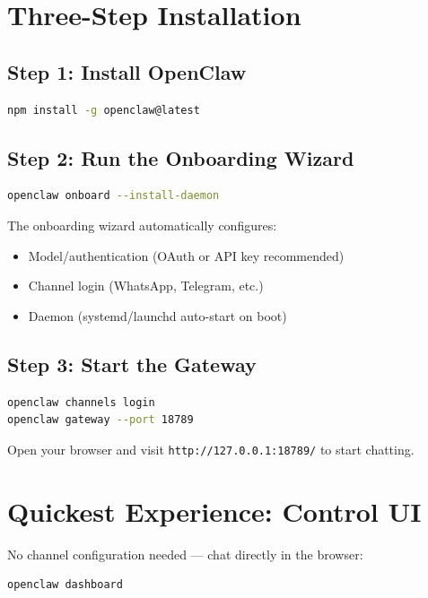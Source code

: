 \section{Three-Step Installation}

\subsection{Step 1: Install OpenClaw}

\begin{lstlisting}[language=bash]
npm install -g openclaw@latest
\end{lstlisting}

\subsection{Step 2: Run the Onboarding Wizard}

\begin{lstlisting}[language=bash]
openclaw onboard --install-daemon
\end{lstlisting}

The onboarding wizard automatically configures:
\begin{itemize}
  \item Model/authentication (OAuth or API key recommended)
  \item Channel login (WhatsApp, Telegram, etc.)
  \item Daemon (systemd/launchd auto-start on boot)
\end{itemize}

\subsection{Step 3: Start the Gateway}

\begin{lstlisting}[language=bash]
openclaw channels login
openclaw gateway --port 18789
\end{lstlisting}

Open your browser and visit \texttt{http://127.0.0.1:18789/} to start chatting.

\section{Quickest Experience: Control UI}

No channel configuration needed --- chat directly in the browser:

\begin{lstlisting}[language=bash]
openclaw dashboard
\end{lstlisting}

